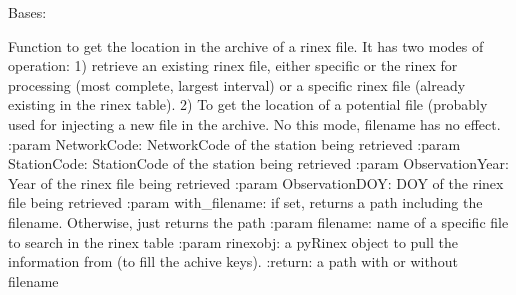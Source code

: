 \documentclass[letterpaper,10pt,english]{sphinxmanual}
\begin{document}
\begin{fulllineitems}
\label{\detokenize{classes:classes.pyArchiveStruct.RinexStruct}}
\pysigstartsignatures
{}
\pysigstopsignatures
\sphinxAtStartPar
Bases: 

\begin{fulllineitems}
\label{\detokenize{classes:classes.pyArchiveStruct.RinexStruct.build_rinex_path}}
\pysigstartsignatures
{}
\pysigstopsignatures
\sphinxAtStartPar
Function to get the location in the archive of a rinex file. It has two modes of operation:
1) retrieve an existing rinex file, either specific or the rinex for processing
(most complete, largest interval) or a specific rinex file (already existing in the rinex table).
2) To get the location of a potential file (probably used for injecting a new file in the archive. No this mode,
filename has no effect.
:param NetworkCode: NetworkCode of the station being retrieved
:param StationCode: StationCode of the station being retrieved
:param ObservationYear: Year of the rinex file being retrieved
:param ObservationDOY: DOY of the rinex file being retrieved
:param with\_filename: if set, returns a path including the filename. Otherwise, just returns the path
:param filename: name of a specific file to search in the rinex table
:param rinexobj: a pyRinex object to pull the information from (to fill the achive keys).
:return: a path with or without filename

\end{fulllineitems}



\end{fulllineitems}
\end{document}
